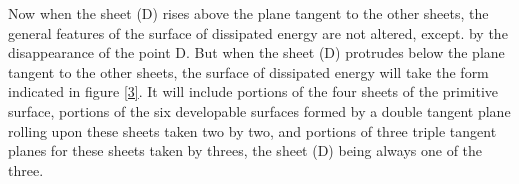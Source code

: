 \documentclass[12pt]{memoir}
\begin{document}
\begin{figure}[h]
\begin{minipage}{.3\textwidth}
  \label{fig_3}
\end{minipage}
\end{figure}

Now when the sheet (D) rises above the plane tangent to the other sheets, the general features of the surface of dissipated energy are not altered, except. by the disappearance of the point D. But when the sheet (D) protrudes below the plane tangent to the other sheets, the surface of dissipated energy will take the form indicated in figure \ref{3}. It will include portions of the four sheets of the primitive surface, portions of the six developable surfaces formed by a double tangent plane rolling upon these sheets taken two by two, and portions of three triple tangent planes for these sheets taken by threes, the sheet (D) being always one of the three.

\end{document}
